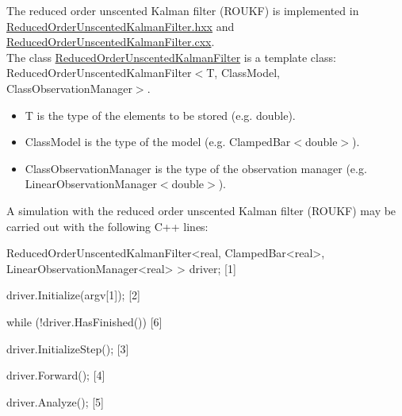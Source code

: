 \documentclass{tufte-book}
\begin{document}
\-The reduced order unscented \-Kalman filter (\-R\-O\-U\-K\-F) is implemented in {\ttfamily \hyperlink{_reduced_order_unscented_kalman_filter_8hxx_source}{\-Reduced\-Order\-Unscented\-Kalman\-Filter.\-hxx}} and {\ttfamily \hyperlink{_reduced_order_unscented_kalman_filter_8cxx_source}{\-Reduced\-Order\-Unscented\-Kalman\-Filter.\-cxx}}.\\
 \-The class {\ttfamily  \hyperlink{class_verdandi_1_1_reduced_order_unscented_kalman_filter}{\-Reduced\-Order\-Unscented\-Kalman\-Filter}} is a template class\-: \\
 {\ttfamily \-Reduced\-Order\-Unscented\-Kalman\-Filter$<$\-T, Class\-Model, Class\-Observation\-Manager$>$}.
  \begin{itemize}
  \item {\ttfamily \-T} is the type of the elements to be stored (e.\-g. {\ttfamily double}).
  \item {\ttfamily \-Class\-Model} is the type of the model (e.\-g. {\ttfamily \-Clamped\-Bar$<$double$>$}).
  \item {\ttfamily \-Class\-Observation\-Manager} is the type of the observation manager (e.\-g. {\ttfamily \-Linear\-Observation\-Manager$<$double$>$}).
  \end{itemize}
\-A simulation with the reduced order unscented \-Kalman filter (\-R\-O\-U\-K\-F) may be carried out with the following \-C++ lines\-:

 \begin{frame_cpp}
ReducedOrderUnscentedKalmanFilter<real, ClampedBar<real>,
        LinearObservationManager<real> > driver; [1]

driver.Initialize(argv[1]); [2]

while (!driver.HasFinished()) [6]
{
    driver.InitializeStep(); [3]

    driver.Forward(); [4]

    driver.Analyze(); [5]
}
\end{frame_cpp}
\end{document}
